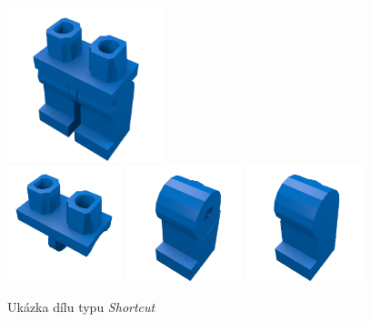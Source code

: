     \begin{figure}[htbp]
        \centering
        \includegraphics[width=0.4\textwidth,height=\textheight,keepaspectratio]{images/3815c01.png}
        \\
        \includegraphics[width=0.3\textwidth,height=\textheight,keepaspectratio]{images/3815.png}
        \includegraphics[width=0.3\textwidth,height=\textheight,keepaspectratio]{images/3816.png}
        \includegraphics[width=0.3\textwidth,height=\textheight,keepaspectratio]{images/3817.png}
        \caption{Ukázka dílu typu \textit{Shortcut} \autocite{rebrickable:part:image:970c00}\autocite{rebrickable:part:image:3815}\autocite{rebrickable:part:image:3816}\autocite{rebrickable:part:image:3817}\label{obrazek-ldraw-shortcut}}
    \end{figure}

